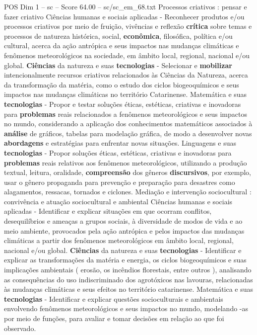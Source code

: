 \begin{textsample}{POS Dim 1 – sc – Score 64.00 – sc/sc\_em\_68.txt}
Processos criativos : pensar e fazer criativo Ciências humanas e sociais aplicadas - Reconhecer produtos e/ou processos criativos por meio de fruição, vivências e reflexão \textbf{crítica} sobre temas e processos de natureza histórica, social, \textbf{econômica}, filosófica, política e/ou cultural, acerca da ação antrópica e seus impactos nas mudanças climáticas e fenômenos meteorológicos na sociedade, em âmbito local, regional, nacional e/ou global. \textbf{Ciências} da natureza e suas \textbf{tecnologias} - Selecionar e \textbf{mobilizar} intencionalmente recursos criativos relacionados às Ciências da Natureza, acerca da transformação da matéria, como o estudo dos ciclos biogeoquímicos e seus impactos nas mudanças climáticas no território Catarinense.
Matemática e suas \textbf{tecnologias} - Propor e testar soluções éticas, estéticas, criativas e inovadoras para \textbf{problemas} reais relacionados a fenômenos meteorológicos e seus impactos no mundo, considerando a aplicação dos conhecimentos matemáticos associados à \textbf{análise} de gráficos, tabelas para modelação gráfica, de modo a desenvolver novas \textbf{abordagens} e estratégias para enfrentar novas situações.
Linguagens e suas \textbf{tecnologias} - Propor soluções éticas, estéticas, criativas e inovadoras para \textbf{problemas} reais relativos aos fenômenos meteorológicos, utilizando a produção textual, leitura, oralidade, \textbf{compreensão} dos gêneros \textbf{discursivos}, por exemplo, usar o gênero propaganda para prevenção e preparação para desastres como alagamentos, ressacas, tornados e ciclones.
Mediação e intervenção sociocultural : convivência e atuação sociocultural e ambiental Ciências humanas e sociais aplicadas - Identificar e explicar situações em que ocorram conflitos, desequilíbrios e ameaças a grupos sociais, à diversidade de modos de vida e ao meio ambiente, provocados pela ação antrópica e pelos impactos das mudanças climáticas a partir dos fenômenos meteorológicos em âmbito local, regional, nacional e/ou global. \textbf{Ciências} da natureza e suas \textbf{tecnologias} - Identificar e explicar as transformações da matéria e energia, os ciclos biogeoquímicos e suas implicações ambientais ( erosão, os incêndios florestais, entre outros ), analisando as consequências do uso indiscriminado dos agrotóxicos nas lavouras, relacionadas às mudanças climáticas e seus efeitos no território catarinense.
Matemática e suas \textbf{tecnologias} - Identificar e explicar questões socioculturais e ambientais envolvendo fenômenos meteorológicos e seus impactos no mundo, modelando -as por meio de funções, para avaliar e tomar decisões em relação ao que foi observado.

\end{textsample}

